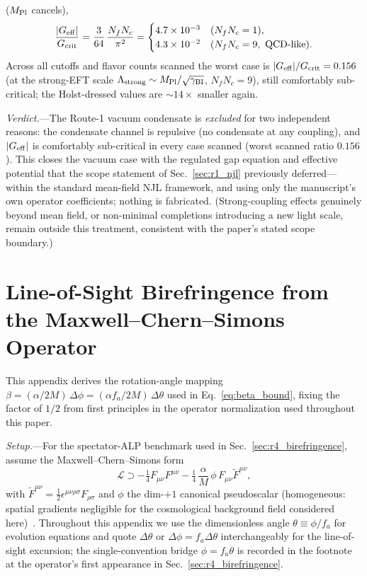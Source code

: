 \documentclass[aps,prd,twocolumn,superscriptaddress,showpacs,preprintnumbers,nofootinbib,longbibliography,floatfix]{revtex4-2}
\begin{document}
($M_{\rm Pl}$ cancels),
\begin{equation}\label{eq:ratio}
\frac{|G_{\rm eff}|}{G_{\rm crit}}=\frac{3}{64}\,\frac{N_f N_c}{\pi^2}
=\begin{cases}
4.7\times10^{-3} & (N_f N_c=1),\\
4.3\times10^{-2} & (N_f N_c=9,\ \text{QCD-like}).
\end{cases}
\end{equation}
Across all cutoffs and flavor counts scanned the worst case is
$|G_{\rm eff}|/G_{\rm crit}=0.156$ (at the strong-EFT scale
$\Lambda_{\rm strong}\sim M_{\rm Pl}/\sqrt{\gamma_{\rm BI}}$, $N_f N_c=9$),
still comfortably sub-critical; the Holst-dressed values are ${\sim}14\times$
smaller again.

\emph{Verdict.}---The Route-1 vacuum condensate is \emph{excluded} for two
independent reasons: the condensate channel is repulsive (no condensate at
any coupling), and $|G_{\rm eff}|$ is comfortably sub-critical in every case
scanned (worst scanned ratio $0.156$).
This closes the vacuum case with the regulated gap equation and effective
potential that the scope statement of Sec.~\ref{sec:r1_njl} previously
deferred---within the standard mean-field NJL framework, and using only the
manuscript's own operator coefficients; nothing is fabricated. (Strong-coupling
effects genuinely beyond mean field, or non-minimal completions introducing a
new light scale, remain outside this treatment, consistent with the paper's
stated scope boundary.)

\section{Line-of-Sight Birefringence from the Maxwell--Chern--Simons
Operator}\label{app:mcs_derivation}

This appendix derives the rotation-angle mapping
$\beta = (\alpha/2M)\,\Delta\phi = (\alpha f_a/2M)\,\Delta\theta$ used in
Eq.~\eqref{eq:beta_bound}, fixing the factor of $1/2$ from first
principles in the operator normalization used throughout this paper.

\textit{Setup.}---For the spectator-ALP benchmark used in
Sec.~\ref{sec:r4_birefringence}, assume the Maxwell--Chern--Simons form
\begin{equation}
\mathcal{L} \supset -\tfrac{1}{4}F_{\mu\nu}F^{\mu\nu}
- \tfrac{1}{4}\,\frac{\alpha}{M}\,\phi\,F_{\mu\nu}\tilde F^{\mu\nu},
\label{eq:mcs_lagrangian}
\end{equation}
with $\tilde F^{\mu\nu} = \tfrac{1}{2}\epsilon^{\mu\nu\rho\sigma}
F_{\rho\sigma}$ and $\phi$ the dim-$+1$ canonical pseudoscalar
(homogeneous: spatial gradients negligible for the cosmological background
field considered here)~\cite{CarrollFieldJackiw1990,HarariSikivie1992}.
Throughout this appendix we use the dimensionless angle
$\theta\equiv\phi/f_a$ for evolution equations and quote $\Delta\theta$
or $\Delta\phi=f_a\Delta\theta$ interchangeably for the line-of-sight
excursion; the single-convention bridge $\phi=f_a\theta$ is recorded in
the footnote at the operator's first appearance in
Sec.~\ref{sec:r4_birefringence}.
\end{document}
